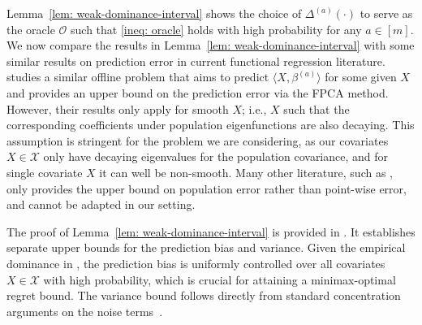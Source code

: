 \documentclass[mnsc]{informs3aa} %
\newcommand{\betaa}{\beta^{(a)}}
\DeclareMathOperator{\Tr}{Tr}
\renewcommand{\hat}{\widehat}
\newcommand{\bT}{\bold{T}}
\renewcommand{\hat}{\widehat}
\renewcommand{\hat}{\widehat}
\newcommand{\mO}{\mathcal O}
\newcommand{\mX}{\mathcal X}
\begin{document}
Lemma~\ref{lem: weak-dominance-interval} shows the choice of $\Delta^{(a)}(\cdot)$ to serve as the oracle $\mO$ such that \eqref{ineq: oracle} holds with high probability for any $a\in[m].$
We now compare the results in Lemma~\ref{lem: weak-dominance-interval} with some similar results on prediction error in current functional regression literature. \cite{cai2006prediction} studies a similar offline problem that aims to predict $\langle X,\betaa \rangle$ for some given $X$ and provides an upper bound on the prediction error via the FPCA method. However, their results only apply for smooth $X$; i.e., $X$ such that the corresponding coefficients under population eigenfunctions are also decaying. This assumption is stringent for the problem we are considering, as our covariates $X\in\mX$ only have decaying eigenvalues for the population covariance, and for single covariate $X$ it can well be non-smooth. Many other literature, such as \cite{cai2012minimax}, only provides the upper bound on population error rather than point-wise error, and cannot be adapted in our setting.

The proof of Lemma~\ref{lem: weak-dominance-interval} is provided in . It establishes separate upper bounds for the prediction bias and variance.
Given the empirical dominance in , the prediction bias is uniformly controlled over all covariates $X \in \mX$ with high probability, which is crucial for attaining a minimax-optimal regret bound. The variance bound follows directly from standard concentration arguments on the noise terms~\citep{cai2012minimax}.

\end{document}

